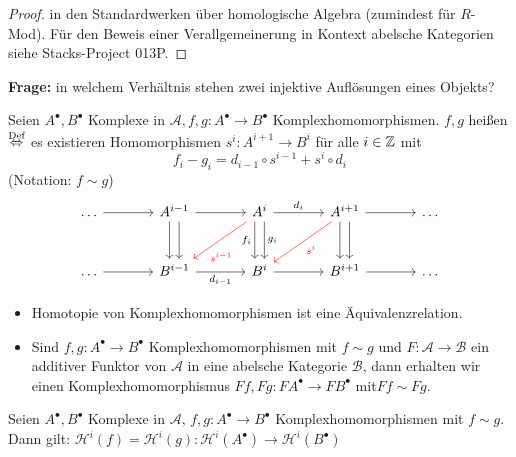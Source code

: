 \begin{proof}
	in den Standardwerken über homologische Algebra (zumindest für $R$-Mod). Für den Beweis einer Verallgemeinerung in Kontext abelsche Kategorien siehe Stacks-Project 013P.
\end{proof}
\textbf{Frage:} in welchem Verhältnis stehen zwei injektive Auflösungen eines Objekts? 
\begin{df}\label{7.10}
	Seien $A^{\bullet}, B^{\bullet} $ Komplexe in $\mathcal{A}, f,g: A^{\bullet} \to B^{\bullet} $ Komplexhomomorphismen. $f,g $ heißen  $\overset{\text{Def}}{\Leftrightarrow} $ es existieren Homomorphismen $ s^{i}: A^{i+1} \to B^i $ für alle $i \in \mathbb{Z} $ mit $$ f_i  -g_i = d_{i-1} \circ s^{i-1} + s^i \circ d_i $$
	(Notation: $f \sim g$)
	$$\begin{tikzcd}[column sep = large, row sep = large]
	\ldots \arrow{r} & A^{i-1}\arrow[xshift = -0.8 ex, swap]{d} \arrow[xshift = 0.8 ex]{d} \arrow{r}& A^i \arrow[red, near end]{dl}{s^{i-1}} \arrow[xshift = -0.8 ex, swap]{d}{f_i} \arrow[xshift = 0.8ex]{d}{g_i} \arrow{r}{d_i} & A^{i+1} \arrow[red]{dl}{s^i} \arrow[xshift = -0.8 ex, swap]{d} \arrow[xshift = 0.8 ex]{d}\arrow{r} & \ldots\\
	\ldots \arrow{r} & B^{i-1} \arrow[swap]{r}{d_{i-1}} & B^i \arrow[swap]{r} & B^{i+1} \arrow{r} & \ldots
	\end{tikzcd}$$
\end{df}
\begin{anm}
	\begin{itemize}
		\item Homotopie von Komplexhomomorphismen ist eine Äquivalenzrelation.
		\item Sind $f,g: A^{\bullet} \to B^{\bullet} $ Komplexhomomorphismen mit $ f \sim g $ und $F: \mathcal{A} \to \mathcal{B} $ ein additiver Funktor von $\mathcal{A} $ in eine abelsche Kategorie $\mathcal{B} $, dann erhalten wir einen Komplexhomomorphismus $ Ff, Fg: FA^{\bullet} \to FB^{\bullet} $ mit$ Ff \sim Fg$.
	\end{itemize}
\end{anm}
\begin{bem}\label{7.11}
	Seien $A^{\bullet}, B^{\bullet} $ Komplexe in $\mathcal{A},\,  f,g: A^{\bullet} \to B^{\bullet} $ Komplexhomomorphismen mit $ f\sim g $. Dann gilt: $ \mathcal{H}^i(f) = \mathcal{H}^i(g): \mathcal{H}^i(A^{\bullet}) \to \mathcal{H}^i(B^{\bullet}) $
\end{bem}
